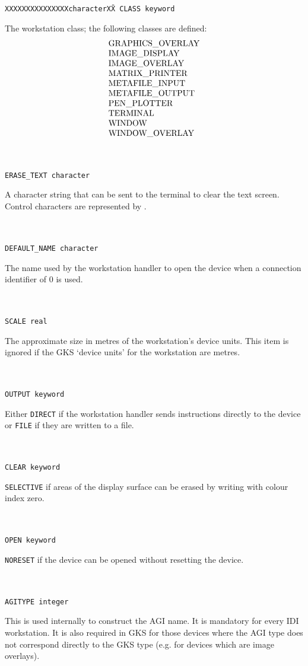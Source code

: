 \newcommand{\desc}[1]{\parbox[t]{30em}{#1}}
\begin{tabbing}
\tt XXXXXXXXXXXXXXX\=\tt characterXX\=\kill
\tt CLASS \>keyword \>\desc{The workstation class; the following classes
are defined:
\[\tt\begin{tabular}{l}
GRAPHICS\_OVERLAY\\
IMAGE\_DISPLAY\\
IMAGE\_OVERLAY\\
MATRIX\_PRINTER\\
METAFILE\_INPUT\\
METAFILE\_OUTPUT\\
PEN\_PLOTTER\\
TERMINAL\\
WINDOW\\
WINDOW\_OVERLAY
\end{tabular}\]}\\
\\
\tt ERASE\_TEXT\footnotemark
\>\tt character \>\desc{A character string that can be sent to
the terminal to clear the text screen. Control characters are represented
by {\tt\char94}.}\\
\\
\tt DEFAULT\_NAME\footnotemark
\>\tt character \>\desc{The name used by the workstation handler
to open the device when a connection identifier of 0 is used.}\\
\\
\tt SCALE
\>\tt real \>\desc{The approximate size in metres of the workstation's 
device units. This item is ignored if the GKS `device units' for the
workstation are metres.}\\
\\
\tt OUTPUT
\>\tt keyword \>\desc{Either {\tt DIRECT} if the workstation handler sends
instructions directly to the device or {\tt FILE} if they are written to
a file.}\\
\\
\tt CLEAR
\>\tt keyword \>\desc{{\tt SELECTIVE} if areas of the display surface
can be erased by writing with colour index zero.}\\
\\
\tt OPEN
\>\tt keyword \>\desc{{\tt NORESET} if the device can be opened without
resetting the device.}\\
\\
\tt AGITYPE
\>\tt integer \>\desc{This is used internally to construct the AGI name.
It is mandatory for every IDI workstation.
It is also required in GKS for those devices where the AGI type does not
correspond directly to the GKS type (e.g. for devices which are image
overlays).}

\end{tabbing}
\addtocounter{footnote}{-1}
\addtocounter{footnote}{1}


